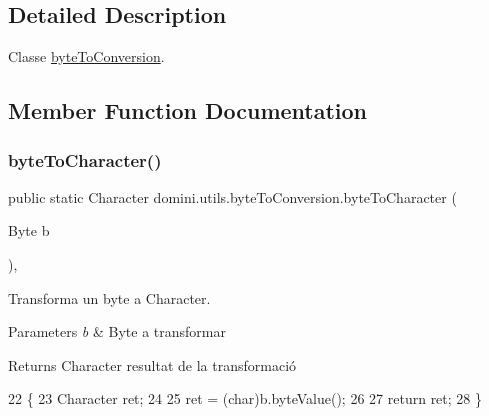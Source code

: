 \subsection{Detailed Description}
Classe \hyperlink{classdomini_1_1utils_1_1byteToConversion}{byte\+To\+Conversion}. 

\subsection{Member Function Documentation}
\mbox{\label{classdomini_1_1utils_1_1byteToConversion_a5d2f5f8de52e4001cf6698ca03fe31e8}} 
\subsubsection{\texorpdfstring{byte\+To\+Character()}{byteToCharacter()}}
{\footnotesize\ttfamily public static Character domini.\+utils.\+byte\+To\+Conversion.\+byte\+To\+Character (\begin{DoxyParamCaption}\item[{Byte}]{b }\end{DoxyParamCaption})\hspace{0.3cm}{\ttfamily [inline]}, {\ttfamily [static]}}



Transforma un byte a Character. 


\begin{DoxyParams}{Parameters}
{\em b} & Byte a transformar \\
\hline
\end{DoxyParams}
\begin{DoxyReturn}{Returns}
Character resultat de la transformació 
\end{DoxyReturn}

\begin{DoxyCode}
22     \{
23         Character ret;
24 
25         ret = (char)b.byteValue();
26 
27         \textcolor{keywordflow}{return} ret;
28     \}
\end{DoxyCode}
\mbox{\label{classdomini_1_1utils_1_1byteToConversion_a3242a47adade49b6cfa6a9232944f587}} 
